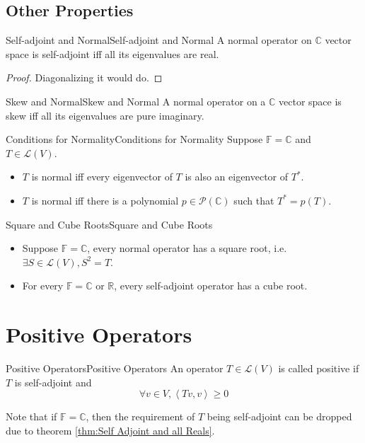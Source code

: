 \documentclass[../main.tex]{subfiles}
\begin{document}
\subsection{Other Properties}

\begin{theorem}{Self-adjoint and Normal}{Self-adjoint and Normal}
A normal operator on $\mathbb{C}$ vector space is self-adjoint iff all its eigenvalues are real.
\end{theorem}
\begin{proof}
Diagonalizing it would do.
\end{proof}

\begin{proposition}{Skew and Normal}{Skew and Normal}
A normal operator on a $\mathbb{C}$ vector space is skew iff all its eigenvalues are pure imaginary.
\end{proposition}

\begin{proposition}{Conditions for Normality}{Conditions for Normality}
Suppose $\mathbb{F}=\mathbb{C}$ and $T\in \mathscr{L}(V)$.
\begin{itemize}
\item $T$ is normal iff every eigenvector of $T$ is also an eigenvector of $T^*$.
\item $T$ is normal iff there is a polynomial $p\in \mathscr{P}(\mathbb{C})$ such that $T^*=p(T)$.
\end{itemize}
\end{proposition}

\begin{proposition}{Square and Cube Roots}{Square and Cube Roots}
\begin{itemize}
\item Suppose $\mathbb{F}=\mathbb{C}$, every normal operator has a square root, i.e. $\exists S\in \mathscr{L}(V), S^2=T$.
\item For every $\mathbb{F}=\mathbb{C}$ or $\mathbb{R}$, every self-adjoint operator has a cube root.
\end{itemize}
\end{proposition}

\section{Positive Operators}
\begin{definition}{Positive Operators}{Positive Operators}
An operator $T\in \mathscr{L}(V)$ is called positive if $T$ is self-adjoint and
\begin{equation}
\forall v\in V,\left<Tv,v\right> \geq 0
\end{equation}
\end{definition}
Note that if $\mathbb{F}=\mathbb{C}$, then the requirement of $T$ being self-adjoint can be dropped due to theorem \ref{thm:Self Adjoint and all Reals}.
\end{document}
